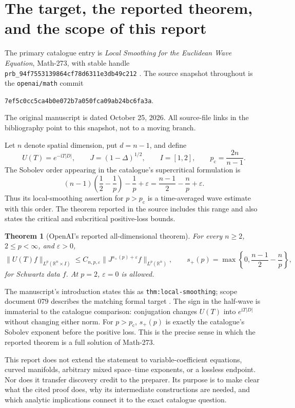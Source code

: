 \documentclass[11pt,a4paper]{article}
\numberwithin{equation}{section}
\newtheorem{theorem}{Theorem}[section]
\theoremstyle{definition}
\theoremstyle{remark}
\newcommand{\R}{\mathbb R}
\newcommand{\eps}{\varepsilon}
\newcommand{\pc}{p_{\mathrm c}}
\begin{document}
\section{The target, the reported theorem, and the scope of this report}
\label{sec:target}
The primary catalogue entry is \emph{Local Smoothing for the Euclidean Wave
Equation}, Math-273, with stable handle
\texttt{prb\_94f7553139864cf78d6311e3db49c212} \cite{catalogue}.
The source snapshot throughout is the \texttt{openai/math} commit
\begin{center}\texttt{7ef5c0cc5ca4b0e072b7a050fca09ab24bc6fa3a}.\end{center}
The original manuscript is dated October 25, 2026. All source-file links in the
bibliography point to this snapshot, not to a moving branch.

Let $n$ denote spatial dimension, put $d=n-1$, and define
\[
 U(T)=e^{-\mathrm iT|D|},\qquad J=(1-\Delta)^{1/2},\qquad
 I=[1,2],\qquad \pc=\frac{2n}{n-1}.
\]
The Sobolev order appearing in the catalogue's supercritical formulation is
\[
 (n-1)\left(\frac12-\frac1p\right)-\frac1p+\eps
       =\frac{n-1}{2}-\frac np+\eps.
\]
Thus its local-smoothing assertion for $p>\pc$ is a time-averaged wave estimate
with this order. The theorem reported in the source includes this range and
also states the critical and subcritical positive-loss bounds.

\begin{theorem}[OpenAI's reported all-dimensional theorem]\label{thm:main}
For every $n\ge2$, $2\le p<\infty$, and $\eps>0$,
\begin{equation}\label{eq:main}
 \|U(T)f\|_{L^p(\R^n\times I)}
 \le C_{n,p,\eps}\|J^{s_+(p)+\eps}f\|_{L^p(\R^n)},\qquad
 s_+(p)=\max\left\{0,\frac{n-1}{2}-\frac np\right\},
\end{equation}
for Schwartz data $f$. At $p=2$, $\eps=0$ is allowed.
\end{theorem}
The manuscript's introduction states this as
\texttt{thm:local-smoothing}; scope document 079 describes the matching
formal target \cite{intro,scope}. The sign in the half-wave is immaterial to
the catalogue comparison: conjugation changes $U(T)$ into $e^{\mathrm iT|D|}$
without changing either norm. For $p>\pc$, $s_+(p)$ is exactly the catalogue's
Sobolev exponent before the positive loss. This is the precise sense in which
the reported theorem is a full solution of Math-273.

This report does not extend the statement to variable-coefficient equations,
curved manifolds, arbitrary mixed space--time exponents, or a lossless endpoint.
Nor does it transfer discovery credit to the preparer. Its purpose is to make
clear what the cited proof does, why its intermediate constructions are needed,
and which analytic implications connect it to the exact catalogue question.
\end{document}
